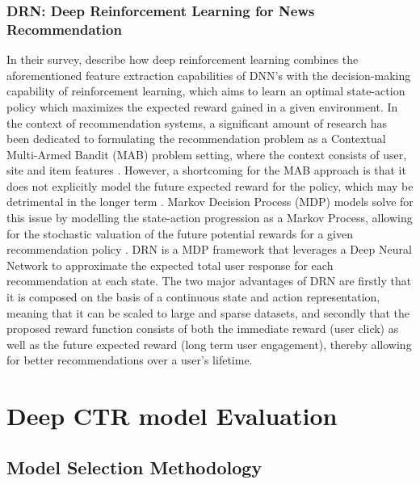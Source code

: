 \documentclass{mldsmsc}
\begin{document}
\subsection{DRN: Deep Reinforcement Learning for News Recommendation}

In their survey, \citep{RefWorks:wang2024deep} describe how deep reinforcement learning combines 
the aforementioned feature extraction capabilities of DNN’s with the decision-making 
capability of reinforcement learning, which aims to learn an optimal state-action policy 
which maximizes the expected reward gained in a given environment. In the context of 
recommendation systems, a significant amount of research has been dedicated to formulating 
the recommendation problem as a Contextual Multi-Armed Bandit (MAB) problem setting, where 
the context consists of user, site and item features \citep{RefWorks:bouneffouf2012contextual-bandit,RefWorks:li2010contextual-bandit,RefWorks:zeng2016online}. 
However, a shortcoming for the MAB approach 
is that it does not explicitly model the future expected reward for the policy, which may 
be detrimental in the longer term \citep{RefWorks:zheng2018drn:}. Markov Decision Process (MDP) models 
solve for this issue by modelling the state-action progression as a Markov Process, allowing 
for the stochastic valuation of the future potential rewards for a given recommendation 
policy \citep{RefWorks:lu2016partially,RefWorks:mahmood2007learning}. DRN \citep{RefWorks:zheng2018drn:} is a MDP framework 
that leverages a Deep Neural Network to approximate the expected total user response for 
each recommendation at each state. The two major advantages of DRN are firstly that it is 
composed on the basis of a continuous state and action representation, meaning that it can 
be scaled to large and sparse datasets, and secondly that the proposed reward function 
consists of both the immediate reward (user click) as well as the future expected reward 
(long term user engagement), thereby allowing for better recommendations over a user’s 
lifetime.

\chapter{Deep CTR model Evaluation}
\label{chap:deep-ctr-model-evaluation}

\section{Model Selection Methodology}
\end{document}
